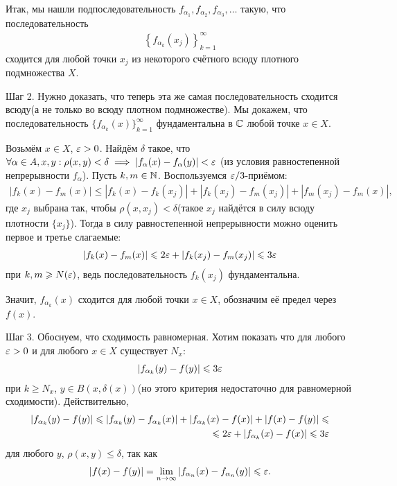 \documentclass[../complex-analysis.tex]{subfiles}
\begin{document}
Итак, мы нашли подпоследовательность $ f_{\alpha_1}, f_{\alpha_2}, f_{\alpha_3}, \ldots$ такую, что последовательность
\begin{align*}
 \left\{f_{\alpha_{k}}(x_j) \right\}_{k=1}^{\infty}
\end{align*} сходится для любой точки $ x_j $ из некоторого счётного всюду плотного подмножества $ X $.

Шаг 2. Нужно доказать, что теперь эта же самая последовательность сходится всюду(а не только во всюду плотном подмножестве). Мы докажем, что последовательность $ \{f_{\alpha_k}(x)\}_{k=1}^{\infty}   $ фундаментальна в $ \mathbb{C} $ любой точке $ x \in X $.

Возьмём $ x \in X $, $ \varepsilon > 0 $. Найдём $ \delta $ такое, что $\forall \alpha \in A, x, y : \rho(x, y) < \delta \implies | f_\alpha(x) - f_\alpha(y)| < \varepsilon$ (из условия равностепенной непрерывности $f_\alpha$). Пусть $ k, m \in \mathbb{N} $. Воспользуемся $ \varepsilon / 3 $-приёмом:
\begin{align*}
 \left| f_{k}(x) - f_{m}(x) \right|\leqslant \left| f_k(x) - f_k(x_j) \right| + \left| f_k(x_j) - f_m(x_j) \right| + \left| f_m(x_j) - f_m(x) \right|,
\end{align*} где $ x_j $ выбрана так, чтобы $ \rho(x, x_j) < \delta $(такое $x_j$ найдётся в силу всюду плотности $\{ x_j\}$). Тогда в силу равностепенной непрерывности можно оценить первое и третье слагаемые:
\begin{align*}
 \left| f_k(x)-f_m(x) \right| \leqslant 2\varepsilon + \left| f_k(x_j) - f_m(x_j) \right| \leqslant 3\varepsilon
\end{align*} при $ k, m \geqslant N(\varepsilon) $, ведь последовательность $ f_k(x_j) $ фундаментальна.

Значит, $ f_{\alpha_k}(x) $ сходится для любой точки $ x \in X $, обозначим её предел через $ f(x) $.

Шаг 3. Обоснуем, что сходимость равномерная. Хотим показать что для любого $ \varepsilon > 0 $ и для любого $ x \in X $ существует $ N_x $:
\begin{align*}
 \left|f_{\alpha_k}(y) - f(y) \right| \leqslant 3\varepsilon
\end{align*} при $ k \geqslant N_x $, $ y \in B(x, \delta(x)) $(но этого критерия недостаточно для равномерной сходимости). Действительно,
\begin{align*}
 \left| f_{\alpha_k}(y) - f(y) \right| \leqslant \left| f_{\alpha_k}(y) - f_{\alpha_k}(x) \right| + \left| f_{\alpha_k}(x) - f(x) \right| + \left| f(x) - f(y) \right| \leqslant \\ \leqslant 2\varepsilon + \left| f_{\alpha_k}(x) - f(x) \right| \leqslant 3\varepsilon
\end{align*}  для любого $ y $, $ \rho(x, y) \leqslant \delta $, так как
\begin{align*}
 \left| f(x) - f(y) \right| = \lim_{n \to \infty} \left|f_{\alpha_n}(x) - f_{\alpha_n}(y) \right| \leqslant \varepsilon.
\end{align*} 
\end{document}
